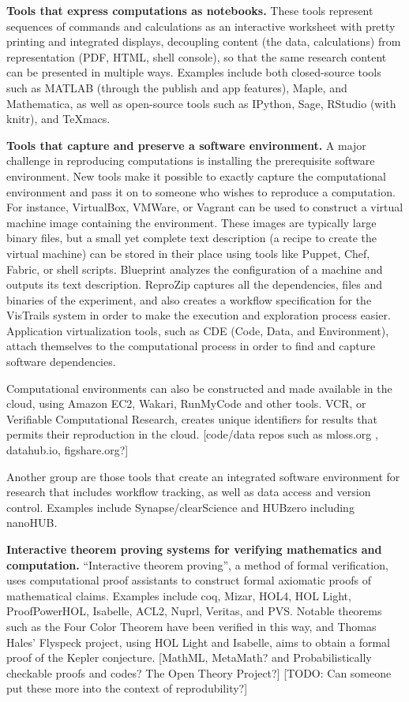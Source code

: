 \documentclass[11pt]{article}
\newcommand{\todo}[1]{{\color{red} [TODO: #1]}}
\newcommand{\comment}[1]{{\color{blue} [#1]}}
\newcommand{\todo}[1]{}
\newcommand{\comment}[1]{}
\begin{document}
{\bf Tools that express computations as notebooks.} These tools represent
sequences of commands and calculations as an interactive worksheet with
pretty printing and integrated displays, decoupling content (the data,
calculations) from representation (PDF, HTML, shell console), so that the
same research content can be presented in multiple ways. Examples include
both closed-source tools such as MATLAB (through the publish and app
features), Maple, and Mathematica, as well as open-source tools such as
IPython, Sage, RStudio (with knitr), and TeXmacs.


{\bf Tools that capture and preserve a software environment.}  A major challenge
in reproducing computations is installing the prerequisite software
environment. New tools make it possible to exactly capture the computational
environment and pass it on to someone who wishes to reproduce a computation.
For instance, VirtualBox, VMWare, or Vagrant can be used to construct a
virtual machine image containing the environment.  These images are
typically large binary files, but a small yet complete text description (a
recipe to create the virtual machine) can be stored in their place using
tools like Puppet, Chef, Fabric, or shell scripts. Blueprint analyzes the
configuration of a machine and outputs its text description. ReproZip
captures all the dependencies, files and binaries of the experiment, and
also creates a workflow specification for the VisTrails system in order to make the
execution and exploration process easier. Application virtualization tools,
such as CDE (Code, Data, and Environment), attach themselves to the
computational process in order to find and capture software dependencies.

Computational environments can also be constructed and made available in the
cloud, using Amazon EC2, Wakari, RunMyCode and other tools. VCR, or
Verifiable Computational Research, creates unique identifiers for results
that permits their reproduction in the cloud. 
\comment{code/data repos such as mloss.org , datahub.io, figshare.org?}

Another group are those tools that create an integrated software environment
for research that includes workflow tracking, as well as data access and
version control. Examples include Synapse/clearScience and HUBzero
including nanoHUB.


{\bf Interactive theorem proving systems for verifying mathematics and
computation.}  ``Interactive theorem proving'', a method of formal
verification, uses computational proof assistants to construct formal
axiomatic proofs of mathematical claims. Examples include
coq, Mizar, HOL4, HOL
Light, ProofPowerHOL, Isabelle, ACL2, Nuprl, Veritas, and PVS. Notable theorems
such as the Four Color Theorem have been verified in this way, and Thomas
Hales’ Flyspeck project, using HOL Light and Isabelle, aims to obtain a
formal proof of the Kepler conjecture.
\comment{MathML, MetaMath? and Probabilistically checkable proofs and codes? The
Open Theory Project?}
\todo{Can someone put these more into the context of reprodubility?}
\end{document}

